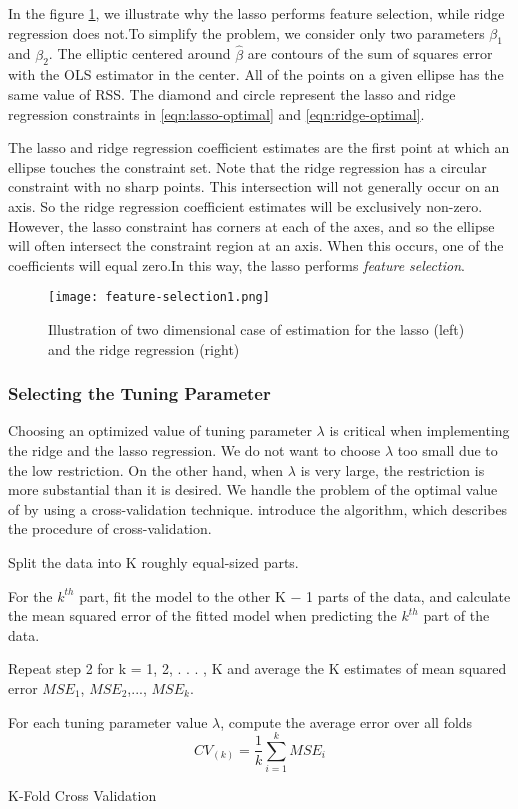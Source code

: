 In the figure \ref{fig:feature-selection}, we illustrate why the lasso performs
feature selection, while ridge regression does not.To simplify the problem, we
consider only two parameters $\beta_1$ and $\beta_2$.
The elliptic centered around $\hat{\beta}$ are contours of the sum of squares
error with the OLS estimator in the center. All of the points on a given ellipse
has the same value of RSS. The diamond and circle represent the lasso and ridge
regression constraints in \ref{eqn:lasso-optimal} and \ref{eqn:ridge-optimal}.

The lasso and ridge regression coefficient estimates are the first point at
which an ellipse touches the constraint set.
Note that the ridge regression has a circular constraint with no sharp points.
This intersection will not generally occur on an axis. So the ridge regression
coefficient estimates will be exclusively non-zero. However, the lasso
constraint has corners at each of the axes, and so the ellipse will often
intersect the constraint region at an axis. When this occurs, one of the
coefficients will equal zero.In this way, the lasso performs \textit{feature
selection}.
\begin{figure}[H]\centering
    \texttt{[image: feature-selection1.png]}
    \caption{Illustration of two dimensional case of estimation for the lasso
    (left) and the ridge regression (right)}
    \label{fig:feature-selection}
\end{figure}

\subsubsection*{Selecting the Tuning Parameter}

Choosing an optimized value of tuning parameter $\lambda$ is critical when
implementing the ridge and the lasso regression.
We do not want to choose $\lambda$ too small due to the low restriction. On the
other hand, when $\lambda$ is very large, the restriction is more substantial
than it is desired. We handle the problem of the optimal value of  by using a
cross-validation technique. \textcite{efron1994introduction} introduce the algorithm, which describes
the procedure of cross-validation.

\begin{algorithm}[H]
\SetAlgoLined
\renewcommand{\labelenumi}{(\Roman{enumi})}
Split the data into K roughly equal-sized parts.

For the $k^{th}$ part, fit the model to the other K − 1 parts of the data, and
calculate the mean squared error of the fitted model when predicting the
$k^{th}$ part of the data.

Repeat step 2 for k = 1, 2, . . . , K and average the K estimates of mean
squared error $MSE_1$, $MSE_2$,..., $MSE_k$.

For each tuning parameter value $\lambda$, compute the average error over all
folds \[CV_{(k)} = \frac{1}{k} \sum_{i=1}^{k} MSE_i\]

 \caption{K-Fold Cross Validation}
\end{algorithm}


